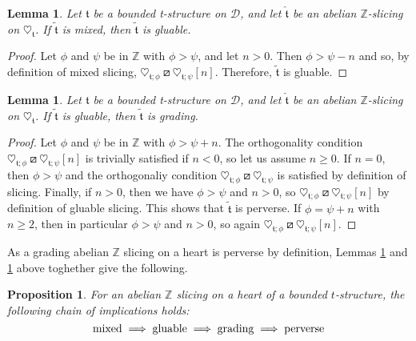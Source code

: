 \documentclass{article}
\newtheorem{prop}[thm]{Proposition}
\newtheorem{lem}[thm]{Lemma}
\theoremstyle{definition}
\newcommand{\Z}{\mathbb{Z}}
\newcommand{\tee}{\mathfrak{t}}
\newcommand{\orth}{\boxslash}
\begin{document}
\begin{lem}\label{mix-to-glue}
Let $\mathfrak{t}$ be a bounded t-structure on $\mathscr{D}$, and let $\hat{\tee}$ be an abelian $\mathbb{Z}$-slicing on $\heartsuit_{\mathfrak{t}}$. If $\tilde{\tee}$ is mixed, then $\tilde{\tee}$ is gluable.
\end{lem}
\begin{proof}
Let $\phi$ and $\psi$ be in $\Z$ with $\phi>\psi$, and let $n>0$. Then $\phi>\psi-n$ and so, by definition of mixed slicing,  $\heartsuit_{\tee;\phi }\orth\heartsuit_{\tee;\psi}[n]$. Therefore, $\tilde{\tee}$ is gluable.
\end{proof}
\begin{lem}\label{glue-to-grad}
Let $\mathfrak{t}$ be a bounded t-structure on $\mathscr{D}$, and let $\hat{\tee}$ be an abelian $\mathbb{Z}$-slicing on $\heartsuit_{\mathfrak{t}}$. If $\tilde{\tee}$ is gluable, then $\tilde{\tee}$ is grading.
\end{lem}
\begin{proof}
Let $\phi$ and $\psi$ be in $\Z$ with $\phi>\psi+n$.
The orthogonality condition $\heartsuit_{\tee;\phi}\orth\heartsuit_{\tee;\psi}[n]$ is trivially satisfied if $n<0$, so let us assume $n\geq 0$. If $n=0$, then $\phi>\psi$ and the orthogonaliy condition $\heartsuit_{\tee;\phi}\orth\heartsuit_{\tee;\psi}$ is satisfied by definition of slicing. Finally, if $n>0$, then we have $\phi>\psi$ and $n>0$, so $\heartsuit_{\tee;\phi}\orth\heartsuit_{\tee;\psi}[n]$ by definition of gluable slicing. This shows that $\tilde{\tee}$ is perverse. If $\phi=\psi+n$ with $n\geq 2$, then in particular $\phi>\psi$ and $n>0$, so again $\heartsuit_{\tee;\phi}\orth\heartsuit_{\tee;\psi}[n]$. 
\end{proof}

As a  grading abelian $\Z$ slicing on a heart is perverse by definition, Lemmas \ref{mix-to-glue} and \ref{glue-to-grad} above toghether give the following.
\begin{prop}
For an abelian $\Z$ slicing on a heart of a bounded $t$-structure, the following chain of implications holds: 
$$\textnormal{mixed} \implies \textnormal{gluable} \implies \textnormal{grading} \implies \textnormal{perverse} $$
\end{prop}
\end{document}
